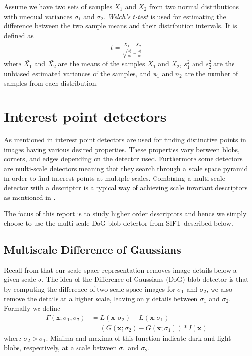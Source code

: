 \documentclass[thesis.tex]{subfiles}
\def\x{\mathbf{x}}
\begin{document}
Assume we have two sets of samples $X_1$ and $X_2$ from two normal distributions with unequal variances $\sigma_1$ and $\sigma_2$. \emph{Welch's $t$-test} is used for estimating the difference between the two sample means and their distribution intervals. It is defined as
\begin{align*}
	t = \frac{\bar{X_1} - \bar{X_2}}{\sqrt{\frac{s^2_1}{n_1} - \frac{s^2_2}{n_2}}}
\end{align*}
where $\bar{X_1}$ and $\bar{X_2}$ are the means of the samples $X_1$ and $X_2$, $s^2_1$ and $s^2_2$ are the unbiased estimated variances of the samples, and $n_1$ and $n_2$ are the number of samples from each distribution.

\section{Interest point detectors}
\label{sec:interestPointDetectors}
As mentioned in  interest point detectors are used for finding distinctive points in images having various desired properties. These properties vary between blobs, corners, and edges depending on the detector used. Furthermore some detectors are multi-scale detectors meaning that they search through a scale space pyramid in order to find interest points at multiple scales. Combining a multi-scale detector with a descriptor is a typical way of achieving scale invariant descriptors as mentioned in .

The focus of this report is to study higher order descriptors and hence we simply choose to use the multi-scale DoG blob detector from SIFT \cite{lowe2004distinctive} described below.

\subsection{Multiscale Difference of Gaussians}
\label{sec:multiscaleDoG}

Recall from  that our scale-space representation removes image details below a given scale $\sigma$. The idea of the Difference of Gaussians (DoG) blob detector is that by computing the difference of two scale-space images for $\sigma_1$ and $\sigma_2$, we also remove the details at a higher scale, leaving only details between $\sigma_1$ and $\sigma_2$. Formally we define
%
\begin{align*}
\Gamma(\x;\sigma_1,\sigma_2) &= L(\x;\sigma_2) - L(\x;\sigma_1) \\
&= \left( G(\x;\sigma_2) - G(\x;\sigma_1) \right) \ast I(\x)
\end{align*}
%
where $\sigma_2 > \sigma_1$. Minima and maxima of this function indicate dark and light blobs, respectively, at a scale between $\sigma_1$ and $\sigma_2$.
\end{document}
